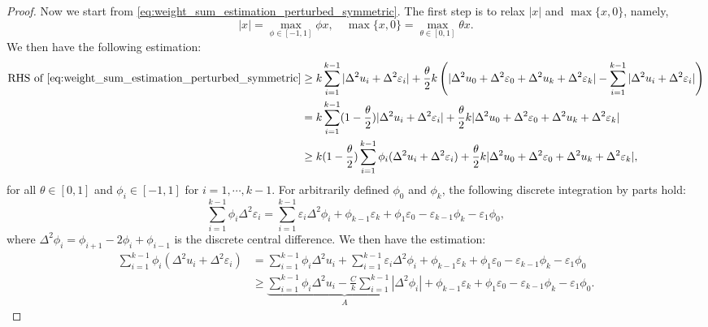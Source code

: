 \documentclass[12pt]{amsart}
\numberwithin{equation}{section}
\theoremstyle{remark}
\begin{document}
\begin{proof}
Now we start from \eqref{eq:weight_sum_estimation_perturbed_symmetric}. The first step is to relax $|x|$ and $\max\{x, 0\}$, namely,
\begin{equation}
    \label{eq:dual_representations}
    |x| = \max_{\phi\in [-1,1]} \phi x, \quad \max\{x, 0\} = \max_{\theta\in [0,1]} \theta x.
\end{equation}
We then have the following estimation:
\begin{equation}
    \begin{aligned}
        \text{RHS of }
        \eqref{eq:weight_sum_estimation_perturbed_symmetric}&\ge k\sum_{i=1}^{k-1} |\Delta^2 u_i+\Delta^2 \varepsilon_i|+ \frac \theta 2 k\left( |\Delta^2 u_0+\Delta^2 \varepsilon_0 + \Delta^2 u_k+\Delta^2 \varepsilon_k|-\sum_{i=1}^{k-1} |\Delta^2 u_i+\Delta^2 \varepsilon_i|\right)\\
        &=k\sum_{i=1}^{k-1} (1-\frac \theta 2) |\Delta^2 u_i+\Delta^2 \varepsilon_i| + \frac \theta 2 k|\Delta^2 u_0+\Delta^2 \varepsilon_0 + \Delta^2 u_k+\Delta^2 \varepsilon_k|\\
        & \ge k(1-\frac{\theta}{2})\sum_{i=1}^{k-1}  \phi_i(\Delta^2 u_i+\Delta^2 \varepsilon_i) + \frac \theta 2 k|\Delta^2 u_0+\Delta^2 \varepsilon_0 + \Delta^2 u_k+\Delta^2 \varepsilon_k|,
    \end{aligned}
\end{equation}
for all $\theta\in [0,1]$ and $\phi_i\in [-1,1]$ for $i=1, \cdots, k-1$.
For arbitrarily defined $\phi_0$ and $\phi_k$, the following discrete integration by parts hold:
\begin{equation}
    \sum_{i=1}^{k-1}\phi_i\Delta^2 \varepsilon_i =\sum_{i=1}^{k-1} \varepsilon_i \Delta^2\phi_i + \phi_{k-1} \varepsilon_k+\phi_1 \varepsilon_0-\varepsilon_{k-1}\phi_k-\varepsilon_1\phi_0,
\end{equation}
where $\Delta^2 \phi_i = \phi_{i+1}-2\phi_i+\phi_{i-1}$ is the discrete central difference. We then have the estimation:
\begin{equation}
    \begin{aligned}
            \sum_{i=1}^{k-1}  \phi_i(\Delta^2 u_i+\Delta^2 \varepsilon_i) &= \sum_{i=1}^{k-1} \phi_i\Delta^2 u_i+\sum_{i=1}^{k-1} \varepsilon_i \Delta^2\phi_i + \phi_{k-1} \varepsilon_k+\phi_1 \varepsilon_0-\varepsilon_{k-1}\phi_k-\varepsilon_1\phi_0\\
            &\ge \underbrace{\sum_{i=1}^{k-1} \phi_i\Delta^2 u_i- \frac{C}{k}\sum_{i=1}^{k-1} |\Delta^2\phi_i|}_{A} + \phi_{k-1} \varepsilon_k+\phi_1 \varepsilon_0-\varepsilon_{k-1}\phi_k-\varepsilon_1\phi_0.

\end{aligned}
\end{equation}
\end{proof}
\end{document}
